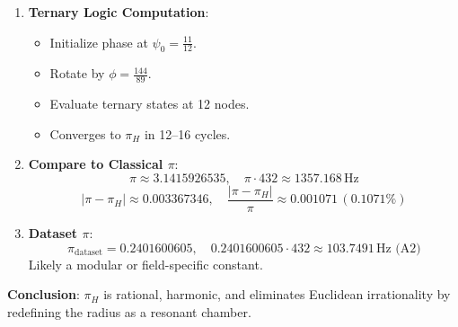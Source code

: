 \documentclass[a4paper,12pt]{article}
\begin{document}
\begin{enumerate}
    \item \textbf{Ternary Logic Computation}:
    \begin{itemize}
        \item Initialize phase at \(\psi_0 = \frac{11}{12}\).
        \item Rotate by \(\phi = \frac{144}{89}\).
        \item Evaluate ternary states at 12 nodes.
        \item Converges to \(\pi_H\) in 12–16 cycles.
    \end{itemize}
    
    \item \textbf{Compare to Classical \(\pi\)}:
    \[
    \pi \approx 3.1415926535, \quad \pi \cdot 432 \approx 1357.168 \, \text{Hz}
    \]
    \[
    |\pi - \pi_H| \approx 0.003367346, \quad \frac{|\pi - \pi_H|}{\pi} \approx 0.001071 \, (0.1071\%)
    \]
    
    \item \textbf{Dataset \(\pi\)}:
    \[
    \pi_{\text{dataset}} = 0.2401600605, \quad 0.2401600605 \cdot 432 \approx 103.7491 \, \text{Hz (A2)}
    \]
    Likely a modular or field-specific constant.
\end{enumerate}

\textbf{Conclusion}: \(\pi_H\) is rational, harmonic, and eliminates Euclidean irrationality by redefining the radius as a resonant chamber.
\end{document}
